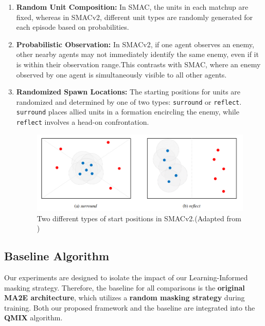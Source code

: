 \begin{enumerate}
    \item \textbf{Random Unit Composition:} In SMAC, the units in each matchup are fixed, whereas in SMACv2, different unit types are randomly generated for each episode based on probabilities.
    \item \textbf{Probabilistic Observation:} In SMACv2, if one agent observes an enemy, other nearby agents may not immediately identify the same enemy, even if it is within their observation range.This contrasts with SMAC, where an enemy observed by one agent is simultaneously visible to all other agents.
    \item \textbf{Randomized Spawn Locations:} The starting positions for units are randomized and determined by one of two types: \texttt{surround} or \texttt{reflect}. \texttt{surround} places allied units in a formation encircling the enemy, while \texttt{reflect} involves a head-on confrontation.

\begin{figure}[H]
    \centering
   
        
    \includegraphics[width= 0.7\linewidth]{img_pfe/start_pos_smacv2.PNG}
 
  
                \caption{Two different types of start positions in SMACv2.(Adapted from \parencite{ma2e})}
        \label{fig:start_pos_smacv2}
\end{figure}
    
\end{enumerate}

\subsection{Baseline Algorithm}

Our experiments are designed to isolate the impact of our Learning-Informed masking strategy. Therefore, the baseline for all comparisons is the \textbf{original \ac{MA2E} architecture}, which utilizes a \textbf{random masking strategy} during training. Both our proposed framework and the baseline are integrated into the \textbf{\ac{QMIX}} algorithm.


